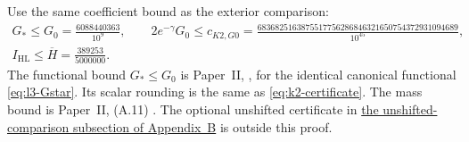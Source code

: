 Use the same coefficient bound as the exterior comparison:
\begin{equation}\label{eq:l3-certificate}
\begin{gathered}
 G_*\le G_0=\frac{6088440363}{10^9},\qquad
 2e^{-\gamma}G_0\le c_{K2,G0}
 =\frac{6836825163875517756286846321650754372931094689}{10^{45}},\\
 I_{\mathrm{HL}}\le\overline H=\frac{389253}{5000000}.
\end{gathered}
\end{equation}
The functional bound \(G_*\le G_0\) is Paper~II,
\cite[(4.73), (4.75), (4.79), (A.10a)]{PaperII}, for the identical
canonical functional \eqref{eq:l3-Gstar}. Its scalar rounding is the
same as \eqref{eq:k2-certificate}. The mass bound is Paper~II, (A.11)
\cite[(A.11)]{PaperII}.
The optional unshifted certificate in
\hyperref[subsec:app-g24]{the unshifted-comparison subsection of
Appendix~B} is outside this proof.

